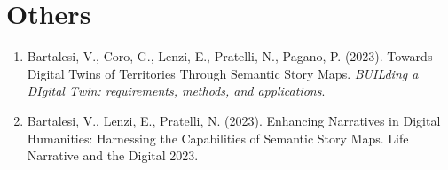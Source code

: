 \section*{Others}
\begin{enumerate}[
    leftmargin=*,
    label={O\arabic*.},
    ref={O\arabic*.}]
    \item Bartalesi, V., Coro, G., Lenzi, E., Pratelli, N., Pagano, P. (2023). Towards Digital Twins of Territories Through Semantic Story Maps. \emph{BUILding a DIgital Twin: requirements, methods, and applications}.
    \item Bartalesi, V., Lenzi, E., Pratelli, N. (2023). Enhancing Narratives in Digital Humanities: Harnessing the Capabilities of Semantic Story Maps. Life Narrative and the Digital 2023.
\end{enumerate}














